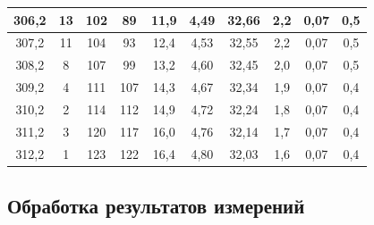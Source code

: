 \begin{center}
\begin{tabular}{|c|c|c|c|c|c|c|c|c|c|}
\hline 
      306,2    &      13    &    102       &    89      &    11,9   &  4,49   &       32,66    &    2,2      &      0,07     &           0,5           \\
\hline 
        307,2  &     11    &       104     &      93    &   12,4    &  4,53   &     32,55      &      2,2    &     0,07      &            0,5          \\
\hline 
     308,2     &    8     &    107     &     99     &   13,2    &  4,60   &     32,45      &     2,0     &        0,07   &          0,5           \\
\hline 
       309,2   &      4    &      111    &      107    &   14,3    &  4,67   &       32,34    &     1,9     &    0,07       &               0,4       \\
\hline
    310,2      &     2    &      114     &      112    &   14,9    &  4,72   &       32,24    &     1,8     &        0,07   &             0,4         \\
\hline 
      311,2    &       3   &       120    &      117    &    16,0   &  4,76   &      32,14     &     1,7     &     0,07      &          0,4            \\
\hline 
     312,2    &      1    &       123    &    122     & 16,4      &    4,80 &    32,03       &       1,6   &     0,07      &          0,4            \\
\hline 

\end{tabular}

\end{center}
\subsection{Обработка результатов измерений}


